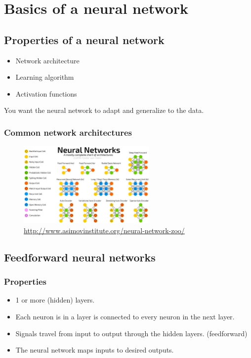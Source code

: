 \documentclass{article}
\begin{document}
\section{Basics of a neural network}
\subsection{Properties of a neural network}

\begin{itemize}
    \item Network architecture
    \item Learning algorithm
    \item Activation functions
\end{itemize}

You want the neural network to adapt and generalize to the data.

\subsubsection{Common network architectures}

\begin{figure}[H]
    \centering
    \includegraphics[width=0.6\textwidth]{img/network-architectures.png}
    \caption{\url{http://www.asimovinstitute.org/neural-network-zoo/}}
\end{figure}

\subsection{Feedforward neural networks}

\subsubsection{Properties}

\begin{itemize}
    \item 1 or more (hidden) layers.
    \item Each neuron is in a layer is connected to every neuron in the next layer.
    \item Signals travel from input to output through the hidden layers. (feedforward)
    \item The neural network maps inputs to desired outputs.
\end{itemize}
\end{document}

